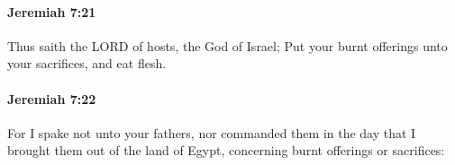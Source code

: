 		\paragraph{Jeremiah 7:21} %
			\label{JEREMIAH-7-21}

			Thus saith the LORD of hosts, the God of Israel; Put your burnt offerings unto your sacrifices, and eat flesh.


		\paragraph{Jeremiah 7:22} %
			\label{JEREMIAH-7-22}

			For I spake not unto your fathers, nor commanded them in the day that I brought them out of the land of Egypt, concerning burnt offerings or sacrifices:


